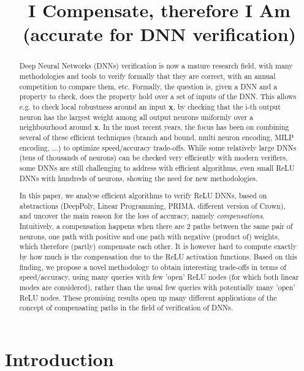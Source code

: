 \documentclass{llncs}
\title{I Compensate, therefore I Am \\ (accurate for DNN verification)}
\date{}
\newcommand{\vx}{\boldsymbol{x}}
\begin{document}
\maketitle

\begin{abstract}
	Deep Neural Networks (DNNs) verification is now a mature research field, with many methodologies and tools to verify formally that they are correct, with an annual competition to compare them, etc. Formally, the question is, given a DNN and a property to check, does the property hold over a set of inputs of the DNN. This allows e.g. to check local robustness around an input $\vx$, by checking that the i-th output neuron has the largest weight among all output neurons uniformly over a neighbourhood around $\vx$. In the most recent years, the focus has been on combining several of these efficient techniques (branch and bound, multi neuron encoding, MILP encoding, ...) to optimize speed/accuracy trade-offs. While some relatively large DNNs (tens of thousands of neurons) can be checked very efficiently with modern verifiers, some DNNs are still challenging to address with efficient algorithms, even small ReLU DNNs with hundreds of neurons, showing the need for new methodologies.
  
	In this paper, we analyse efficient algorithms to verify ReLU DNNs, based on abstractions (DeepPoly, Linear Programming, PRIMA, different version of Crown), and uncover the main reason for the loss of accuracy, namely {\em compensations}. Intuitively, a compensation happens when there are 2 paths between the same pair of neurons, one path with positive and one path with negative (product of) weights, which therefore (partly) compensate each other. It is however hard to compute exactly by how much is the compensation due to the ReLU activation functions. Based on this finding, we propose a novel methodology to obtain interesting trade-offs in terms of speed/accuracy, using many queries with few 'open' ReLU nodes (for which both linear modes are considered), rather than the usual few queries with potentially many 'open' ReLU nodes. These promising results open up many different applications of the concept of compensating paths in the field of verification of DNNs.  
\end{abstract}


\section{Introduction}
\end{document}
